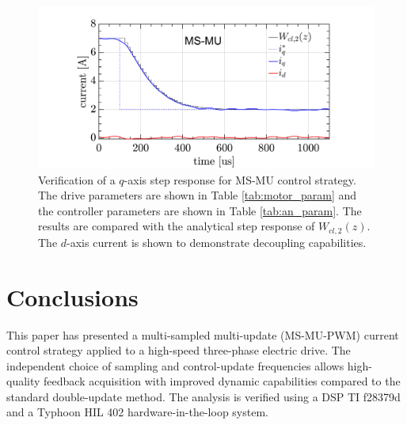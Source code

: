 \documentclass[conference]{IEEEtran}
\begin{document}
\begin{figure}[t!]
    \centerline{\includegraphics[width=1\linewidth]{figures/ivan figs/MSMUstepHIL.png}}
    \caption{Verification of a $q$-axis step response for MS-MU control strategy. The drive parameters are shown in Table \ref{tab:motor_param} and the controller parameters are shown in Table \ref{tab:an_param}. The results are compared with the analytical step response of $W_{cl,2}(z)$. The $d$-axis current is shown to demonstrate decoupling capabilities.}
    \label{fig:MSMUmaf_step} 
\end{figure}


\section{Conclusions}
This paper has presented a multi-sampled multi-update (MS-MU-PWM) current control strategy applied to a high-speed three-phase electric drive. The independent choice of sampling and control-update frequencies allows high-quality feedback acquisition with improved dynamic capabilities compared to the standard double-update method. The analysis is verified using a DSP TI f28379d and a Typhoon HIL 402 hardware-in-the-loop system.

\ifCLASSOPTIONcaptionsoff
  \newpage
\fi



\end{document}

